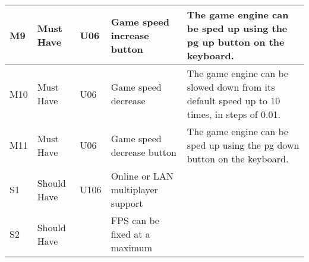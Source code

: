 \documentclass{article} %
\begin{document}
\begin{longtable}{|p{}|p{}|p{}|p{}|p{}|}
    M9                          & Must Have                          & U06                & Game speed increase button        & The game engine can be sped up using the pg up button on the keyboard.                                                                                      \\ \hline
    M10                         & Must Have                          & U06                & Game speed decrease               & The game engine can be slowed down from its default speed up to 10 times, in steps of 0.01.                                                                 \\ \hline
    M11                         & Must Have                          & U06                & Game speed decrease button        & The game engine can be sped up using the pg down button on the keyboard.                                                                                    \\ \hline
    S1                          & Should Have                        & U106               & Online or LAN multiplayer support &                                                                                                                                                             \\ \hline
    S2                          & Should Have                        &                    & FPS can be fixed at a maximum     &                                                                                                                                                             \\ \hline
\end{longtable}
\newpage
\end{document}
